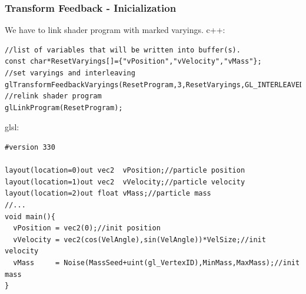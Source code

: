 \begin{frame}[fragile]
\frametitle{Transform Feedback - Inicialization}
  We have to link shader program with marked varyings.
	c++:
{\scriptsize
\begin{verbatim}
//list of variables that will be written into buffer(s).
const char*ResetVaryings[]={"vPosition","vVelocity","vMass"};
//set varyings and interleaving
glTransformFeedbackVaryings(ResetProgram,3,ResetVaryings,GL_INTERLEAVED_ATTRIBS);
//relink shader program
glLinkProgram(ResetProgram);
\end{verbatim}
}
	glsl:
{\scriptsize
\begin{verbatim}
#version 330

layout(location=0)out vec2  vPosition;//particle position
layout(location=1)out vec2  vVelocity;//particle velocity
layout(location=2)out float vMass;//particle mass
//...
void main(){
  vPosition = vec2(0);//init position
  vVelocity = vec2(cos(VelAngle),sin(VelAngle))*VelSize;//init velocity
  vMass     = Noise(MassSeed+uint(gl_VertexID),MinMass,MaxMass);//init mass
}
\end{verbatim}
}
\end{frame}

